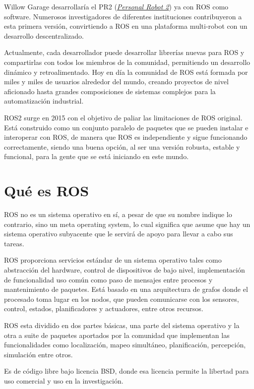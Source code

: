 Willow Garage desarrollaría el PR2 (\href{https://www.xatakaciencia.com/robotica/pr2-el-robot-de-codigo-abierto}{\textit{Personal Robot 2}}) ya con ROS como software. Numerosos investigadores de diferentes instituciones contribuyeron a esta primera versión, convirtiendo a ROS en una plataforma multi-robot con un desarrollo descentralizado.

Actualmente, cada desarrollador puede desarrollar librerías nuevas para ROS y compartirlas con todos los miembros de la comunidad, permitiendo un desarrollo dinámico y retroalimentado. Hoy en día la comunidad de ROS está formada por miles y miles de usuarios alrededor del mundo, creando proyectos de nivel aficionado hasta grandes composiciones de sistemas complejos para la automatización industrial.

ROS2 surge en 2015 con el objetivo de paliar las limitaciones de ROS original. Está construido como un conjunto paralelo de paquetes que se pueden instalar e interoperar con ROS, de manera que ROS es independiente y sigue funcionando correctamente, siendo una buena opción, al ser una versión robusta, estable y funcional, para la gente que se está iniciando en este mundo.

\section{Qué es ROS}
ROS no es un sistema operativo en sí, a pesar de que su nombre indique lo contrario, sino un meta operating system, lo cual significa que asume que hay un sistema operativo subyacente que le servirá de apoyo para llevar a cabo sus tareas.

ROS proporciona servicios estándar de un sistema operativo tales como abstracción del hardware, control de dispositivos de bajo nivel, implementación de funcionalidad uso común como paso de mensajes entre procesos y mantenimiento de paquetes. Está basado en una arquitectura de grafos donde el procesado toma lugar en los nodos, que pueden comunicarse con los sensores, control, estados, planificadores y actuadores, entre otros recursos.

ROS esta dividido en dos partes básicas, una parte del sistema operativo y la otra a suite de paquetes aportados por la comunidad que implementan las funcionalidades como localización, mapeo simultáneo, planificación, percepción, simulación entre otros.

Es de código libre bajo licencia BSD, donde esa licencia permite la libertad para uso comercial y uso en la investigación.

